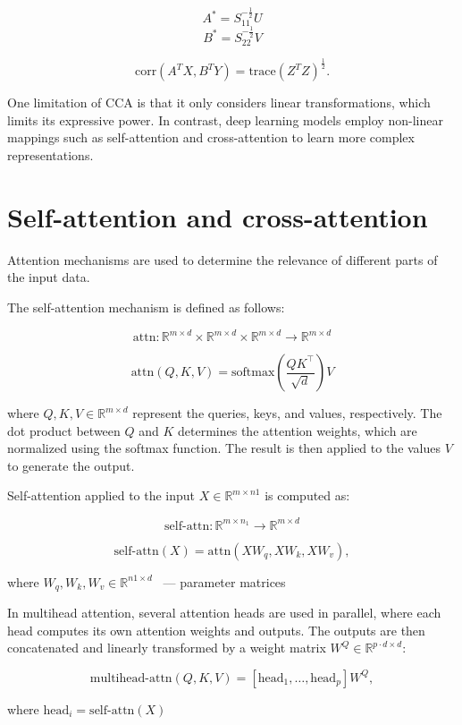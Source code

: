 \documentclass[a4paper,14pt]{article}
\newcommand{\dR}{\mathbb{R}}
\theoremstyle{plain} %
\theoremstyle{definition} %
\theoremstyle{remark} %
\begin{document}
	\[
	A^* = S_{11}^{-\frac{1}{2}} U
	\]
	\[
	B^* = S_{22}^{-\frac{1}{2}} V \tag{2}
	\]
	
	\[
	\text{corr}(A^T X, B^T Y) = \text{trace}(Z^T Z)^{\frac{1}{2}}.
	\]
	
	One limitation of CCA is that it only considers linear transformations, which limits its expressive power. In contrast, deep learning models employ non-linear mappings such as self-attention and cross-attention to learn more complex representations.
	
	\section*{Self-attention and cross-attention}
	
	Attention mechanisms are used to determine the relevance of different parts of the input data.
	
	The self-attention mechanism is defined as follows:
	
	\[
	\text{attn}: \dR^{m \times d} \times \dR^{m \times d} \times \dR^{m \times d} \longrightarrow \dR^{m \times d}
	\]
	
	\[
	\text{attn}(Q, K, V) = \text{softmax}\left(\frac{Q K^\top}{\sqrt{d}}\right) V
	\]
	
	where $Q, K, V \in \dR^{m \times d}$ represent the queries, keys, and values, respectively. The dot product between $Q$ and $K$ determines the attention weights, which are normalized using the softmax function. The result is then applied to the values $V$ to generate the output.
	
	Self-attention applied to the input $X \in \dR^{m \times n1}$ is computed as:
	
	\[
	\text{self-attn}: \dR^{m \times n_1} \longrightarrow \dR^{m \times d}
	\]
	
	\[
	\text{self-attn}(X) = \text{attn}(X W_q, X W_k, X W_v),
	\]
	
	where $W_q, W_k, W_v \in \dR^{n1 \times d}$ ~--- parameter matrices
	
	
	In multihead attention, several attention heads are used in parallel, where each head computes its own attention weights and outputs. The outputs are then concatenated and linearly transformed by a weight matrix $W^Q \in \dR^{p \cdot d \times d}$:

	
	\[
	\text{multihead-attn}(Q, K, V) = [\text{head}_1, \ldots, \text{head}_p] W^Q,
	\]
	
	where $\text{head}_i = \text{self-attn}(X)$
	
\end{document}
